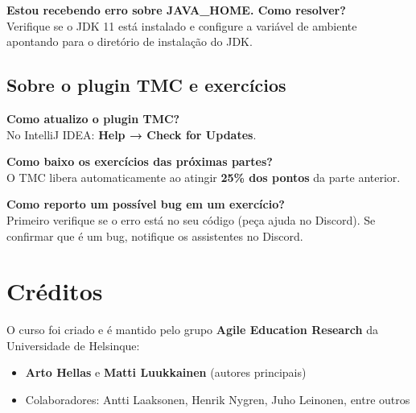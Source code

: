 \documentclass[11pt,a4paper]{article}
\begin{document}
\vspace{0.5em}
\begin{faqbox}
\textbf{Estou recebendo erro sobre JAVA\_HOME. Como resolver?}\\
Verifique se o JDK 11 está instalado e configure a variável de ambiente  apontando para o diretório de instalação do JDK.
\end{faqbox}

\subsection{Sobre o plugin TMC e exercícios}

\begin{faqbox}
\textbf{Como atualizo o plugin TMC?}\\
No IntelliJ IDEA: \textbf{Help → Check for Updates}.
\end{faqbox}

\vspace{0.5em}
\begin{faqbox}
\textbf{Como baixo os exercícios das próximas partes?}\\
O TMC libera automaticamente ao atingir \textbf{25\% dos pontos} da parte anterior.
\end{faqbox}

\vspace{0.5em}
\begin{faqbox}
\textbf{Como reporto um possível bug em um exercício?}\\
Primeiro verifique se o erro está no seu código (peça ajuda no Discord). Se confirmar que é um bug, notifique os assistentes no Discord.
\end{faqbox}

\section{Créditos}

O curso foi criado e é mantido pelo grupo \textbf{Agile Education Research} da Universidade de Helsinque:

\begin{itemize}
  \item \textbf{Arto Hellas} e \textbf{Matti Luukkainen} (autores principais)
  \item Colaboradores: Antti Laaksonen, Henrik Nygren, Juho Leinonen, entre outros
\end{itemize}
\end{document}
